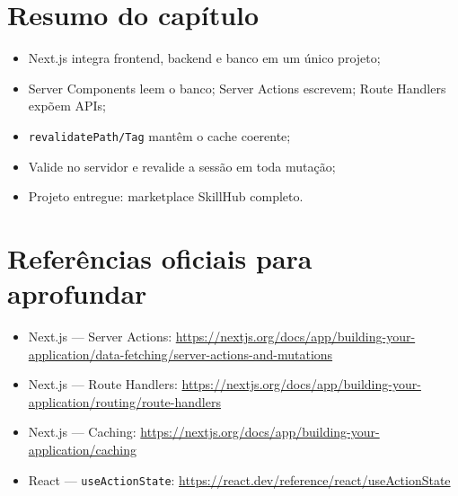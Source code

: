 \section{Resumo do capítulo}

\begin{itemize}[leftmargin=*, itemsep=0.3em]
  \item Next.js integra frontend, backend e banco em um único projeto;
  \item Server Components leem o banco; Server Actions escrevem; Route Handlers expõem APIs;
  \item \texttt{revalidatePath/Tag} mantêm o cache coerente;
  \item Valide no servidor e revalide a sessão em toda mutação;
  \item Projeto entregue: marketplace SkillHub completo.
\end{itemize}

\section{Referências oficiais para aprofundar}

\begin{itemize}[leftmargin=*, itemsep=0.3em]
  \item Next.js — Server Actions: \url{https://nextjs.org/docs/app/building-your-application/data-fetching/server-actions-and-mutations}
  \item Next.js — Route Handlers: \url{https://nextjs.org/docs/app/building-your-application/routing/route-handlers}
  \item Next.js — Caching: \url{https://nextjs.org/docs/app/building-your-application/caching}
  \item React — \texttt{useActionState}: \url{https://react.dev/reference/react/useActionState}
\end{itemize}

